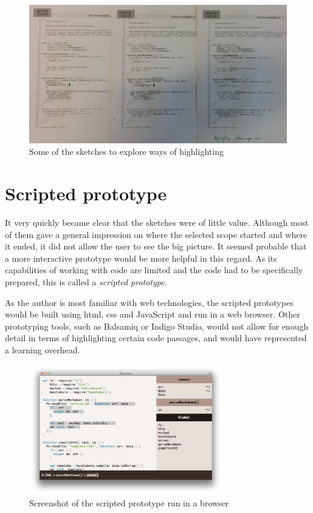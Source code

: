\begin{figure}[htbp]
\centering
\includegraphics[keepaspectratio,width=\textwidth]{img/sketch_highlighting.jpeg}
\caption{Some of the sketches to explore ways of highlighting}
\label{fig:sketches2}
\end{figure}

\section{Scripted prototype}\label{scripted-prototype}

It very quickly became clear that the sketches were of little value.
Although most of them gave a general impression on where the selected
scope started and where it ended, it did not allow the user to see the
big picture. It seemed probable that a more interactive prototype would
be more helpful in this regard. As its capabilities of working with code
are limited and the code had to be specifically prepared, this is called
a \emph{scripted prototype}.

As the author is most familiar with web technologies, the scripted
prototypes would be built using \ac{html}, \ac{css} and JavaScript and
run in a web browser. Other prototyping tools, such as Balsamiq or
Indigo Studio, would not allow for enough detail in terms of
highlighting certain code passages, and would have represented a
learning overhead.

\begin{figure}[htbp]
\centering
\includegraphics[keepaspectratio,width=0.75\textwidth,height=0.75\textheight]{img/prototype-1.png}
\caption{Screenshot of the scripted prototype run in a browser}
\label{fig:scriptedprototype}
\end{figure}

